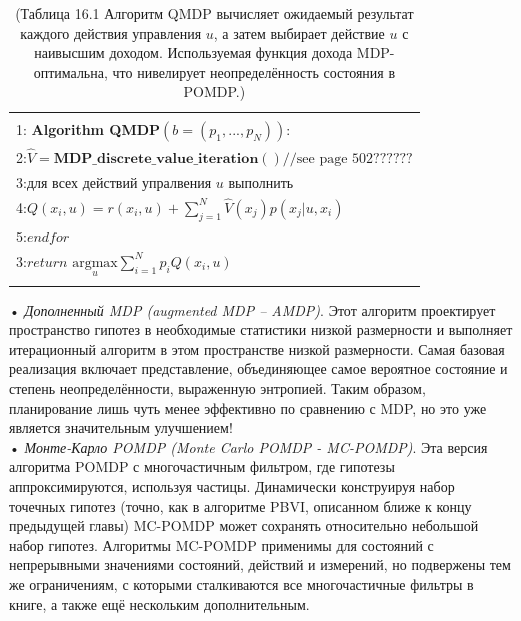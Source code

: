 \documentclass[10pt,a4paper]{article}
\begin{document}
\begin{table}[H]
\begin{center}
\begin{tabular}{|l|}
\hline
{}\\
1:\textbf{ Algorithm QMDP}$(b=(p_1,...,p_N)):\qquad\qquad\qquad$\\
2:\hspace{5mm}$\hat{V}=\textbf{MDP\_discrete\_value\_iteration}()//\text{see page 502??????}$\\
3:\hspace{5mm}$\textit{для всех действий упралвения u выполнить}$\\
4:\hspace{10mm}$Q(x_i,u)=r(x_i,u)+\sum_{j=1}^N\hat{V}(x_j)p(x_j|u,x_i)$\\
5:\hspace{5mm}$\textit{endfor}$\\
3:\hspace{5mm}$\textit{return}\,\,\underset{u}{\text{argmax}}\sum_{i=1}^Np_iQ(x_i,u)$\\
{}\\
\hline
\end{tabular}
\caption{(Таблица 16.1 Алгоритм QMDP вычисляет ожидаемый результат каждого действия управления $u$, а затем выбирает действие $u$ с наивысшим доходом. Используемая функция дохода MDP-оптимальна, что нивелирует неопределённость состояния в POMDP.)}
\end{center}
\end{table}

•\textit{	Дополненный MDP (augmented MDP – AMDP)}. Этот алгоритм проектирует пространство гипотез в необходимые статистики низкой размерности и выполняет итерационный алгоритм в этом пространстве низкой размерности. Самая базовая реализация включает представление, объединяющее самое вероятное состояние и степень неопределённости, выраженную энтропией. Таким образом, планирование лишь чуть менее эффективно по сравнению с MDP, но это уже является значительным улучшением!\\

•	\textit{Монте-Карло POMDP (Monte Carlo POMDP - MC-POMDP)}. Эта версия алгоритма POMDP с многочастичным фильтром, где гипотезы аппроксимируются, используя частицы. Динамически конструируя набор точечных гипотез (точно, как в алгоритме PBVI, описанном ближе к концу предыдущей главы) MC-POMDP может сохранять относительно небольшой набор гипотез. Алгоритмы MC-POMDP применимы для состояний с непрерывными значениями состояний, действий и измерений, но подвержены тем же ограничениям, с которыми сталкиваются все многочастичные фильтры в книге, а также ещё нескольким дополнительным.\\
\end{document}
